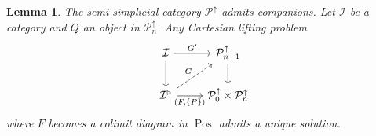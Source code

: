 \documentclass[10pt]{amsart}
\numberwithin{equation}{section}
\newtheorem{lem}[prop]{Lemma}
\theoremstyle{definition}
\DeclareMathOperator{\Pos}{Pos}
\newcommand{\cI}{\mathcal{I}}
\newcommand{\cP}{\mathcal{P}}
\begin{document}
\begin{lem}\label{lem:P_has_companions}
	The semi-simplicial category $\cP^{\uparrow}$ admits companions.
  Let $\cI$ be a category and $Q$ an object in $\cP^{\uparrow}_{n}$.
  Any Cartesian lifting problem
	\begin{equation*}
		\begin{tikzcd}
			\cI \arrow[r, "G'"] \arrow[d]      &   \cP^{\uparrow}_{n+1}  \arrow[d] \\
			\cI^{\triangleright}  \arrow[r, "{(F, \left\{ P\right\})}"']  \arrow[ur, dashed, "G"]             &   \cP^{\uparrow}_{0} \times \cP^{\uparrow}_{n}
		\end{tikzcd}
	\end{equation*}
	where $F$ becomes a colimit diagram in $\Pos$ admits a unique solution.
\end{lem}
\end{document}
